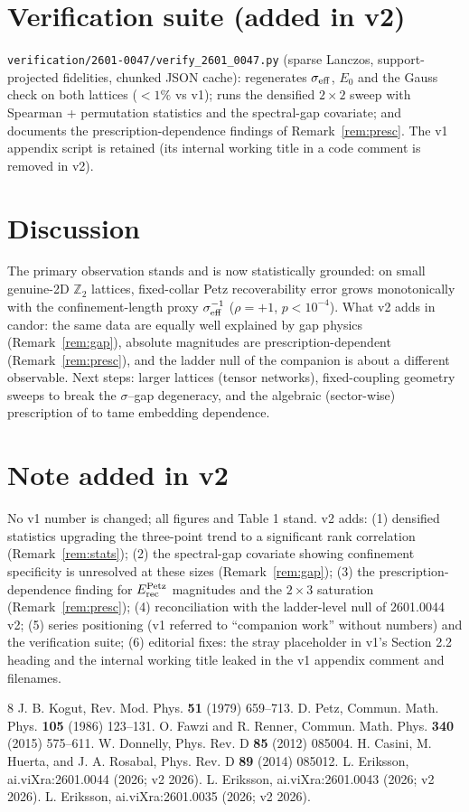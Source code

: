 \documentclass[11pt]{article}
\theoremstyle{remark}
\newcommand{\Erec}{E^{\rm Petz}_{\rm rec}}
\begin{document}
\section{Verification suite (added in v2)}
\texttt{verification/2601-0047/verify\_2601\_0047.py} (sparse Lanczos,
support-projected fidelities, chunked JSON cache): regenerates
$\sigma_{\rm eff}$, $E_0$ and the Gauss check on both lattices
($<1\%$ vs v1); runs the densified $2\times2$ sweep with Spearman +
permutation statistics and the spectral-gap covariate; and documents the
prescription-dependence findings of Remark~\ref{rem:presc}. The v1
appendix script is retained (its internal working title in a code comment
is removed in v2).

\section{Discussion}
The primary observation stands and is now statistically grounded: on
small genuine-2D $\mathbb{Z}_2$ lattices, fixed-collar Petz
recoverability error grows monotonically with the confinement-length
proxy $\sigma_{\rm eff}^{-1}$ ($\rho = +1$, $p < 10^{-4}$). What v2 adds
in candor: the same data are equally well explained by gap physics
(Remark~\ref{rem:gap}), absolute magnitudes are prescription-dependent
(Remark~\ref{rem:presc}), and the ladder null of the companion is about a
different observable. Next steps: larger lattices (tensor networks),
fixed-coupling geometry sweeps to break the $\sigma$--gap degeneracy, and
the algebraic (sector-wise) prescription of \cite{S0044} to tame
embedding dependence.

\section*{Note added in v2}
No v1 number is changed; all figures and Table 1 stand. v2 adds:
(1) densified statistics upgrading the three-point trend to a significant
rank correlation (Remark~\ref{rem:stats}); (2) the spectral-gap covariate
showing confinement specificity is unresolved at these sizes
(Remark~\ref{rem:gap}); (3) the prescription-dependence finding for
$\Erec$ magnitudes and the $2\times3$ saturation
(Remark~\ref{rem:presc}); (4) reconciliation with the ladder-level null
of 2601.0044 v2; (5) series positioning (v1 referred to ``companion
work'' without numbers) and the verification suite; (6) editorial fixes:
the stray placeholder in v1's Section 2.2 heading and the internal
working title leaked in the v1 appendix comment and filenames.

\begin{thebibliography}{8}
 J. B. Kogut, Rev. Mod. Phys. \textbf{51} (1979)
659--713.
 D. Petz, Commun. Math. Phys. \textbf{105} (1986)
123--131.
 O. Fawzi and R. Renner, Commun. Math. Phys. \textbf{340}
(2015) 575--611.
 W. Donnelly, Phys. Rev. D \textbf{85} (2012) 085004.
 H. Casini, M. Huerta, and J. A. Rosabal, Phys. Rev. D
\textbf{89} (2014) 085012.
 L. Eriksson, ai.viXra:2601.0044 (2026; v2 2026).
 L. Eriksson, ai.viXra:2601.0043 (2026; v2 2026).
 L. Eriksson, ai.viXra:2601.0035 (2026; v2 2026).
\end{thebibliography}
\end{document}
